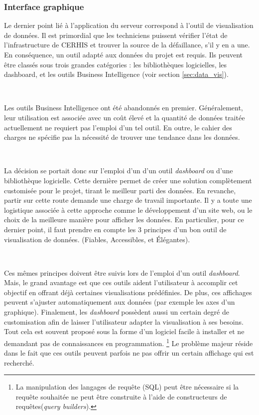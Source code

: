 \newpage

\subsubsection{Interface graphique}

\noindent
Le dernier point lié à l'application du serveur correspond à l'outil de visualisation de données. Il est primordial que les techniciens puissent vérifier l'état de l'infrastructure de CERHIS et trouver la source de la défaillance, s'il y en a une. En conséquence, un outil adapté aux données du projet est requis. Ils peuvent être classés sous trois grandes catégories : les bibliothèques logicielles, les dashboard, et les outils Business Intelligence (voir section \ref{sec:data_vis}).

~

\noindent
Les outils Business Intelligence ont été abandonnés en premier. Généralement, leur utilisation est associée avec un coût élevé et la quantité de données traitée actuellement ne requiert pas l'emploi d'un tel outil. En outre, le cahier des charges ne spécifie pas la nécessité de trouver une tendance dans les données.

~

\noindent
La décision se portait donc sur l'emploi d'un d'un outil \textit{dashboard} ou d'une bibliothèque logicielle. Cette dernière permet de créer une solution complètement customisée pour le projet, tirant le meilleur parti des données. En revanche, partir sur cette route demande une charge de travail importante. Il y a toute une logistique associée à cette approche comme le développement d'un site web, ou le choix de la meilleure manière pour afficher les données. En particulier, pour ce dernier point, il faut prendre en compte les 3 principes d'un bon outil de visualisation de données. (Fiables, Accessibles, et Élégantes).

~

\noindent
Ces mêmes principes doivent être suivis lors de l'emploi d'un outil \textit{dashboard}. Mais, le grand avantage est que ces outils aident l'utilisateur à accomplir cet objectif en offrant déjà certaines visualisations prédéfinies. De plus, ces affichages peuvent s'ajuster automatiquement aux données (par exemple les axes d'un graphique). Finalement, les \textit{dashboard} possèdent aussi un certain degré de customisation afin de laisser l'utilisateur adapter la visualisation à ses besoins. Tout cela est souvent proposé sous la forme d'un logiciel facile à installer et ne demandant pas de connaissances en programmation. \footnote{La manipulation des langages de requête (SQL) peut être nécessaire si la requête souhaitée ne peut être construite à l'aide de constructeurs de requêtes(\textit{query builders}).} Le problème majeur réside dans le fait que ces outils peuvent parfois ne pas offrir un certain affichage qui est recherché.

